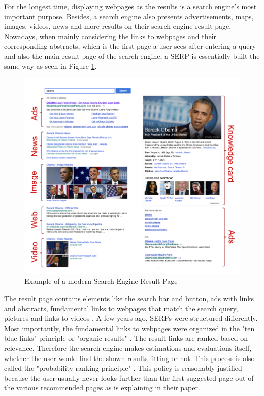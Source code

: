 For the longest time, displaying webpages as the results is a search engine's most important purpose. Besides, a search engine also presents advertisements, maps, images, videos, news and more results on their search engine result page. Nowadays, when mainly considering the links to webpages and their corresponding abstracts, which is the first page a user sees after entering a query and also the main result page of the search engine, a SERP is essentially built the same way as seen in Figure \ref{figure:ModernSerp}. 

\begin{figure}[!ht]
	\centering
	\includegraphics[width=0.75\linewidth]{images/SERP_wang2016beyond.png}
	\caption{
		Example of a modern Search Engine Result Page
	}
	\label{figure:ModernSerp}
\end{figure}


The result page contains elements like the search bar and button, ads with links and abstracts, fundamental links to webpages that match the search query, pictures and links to videos \autocite{wang2016beyond}.
A few years ago, SERPs were structured differently. Most importantly, the fundamental links to webpages were organized in the "ten blue links"-principle or "organic results" \autocite{lewandowski2015evaluating, liu2015influence, wang2016beyond}. The result-links are ranked based on relevance. Therefore the search engine makes estimations and evaluations itself, whether the user would find the shown results fitting or not. This process is also called the "probability ranking principle" \autocite{wang2016beyond}. This policy is reasonably justified because the user usually never looks further than the first suggested page out of the various recommended pages as \textcite{lewandowski2015evaluating} is explaining in their paper.

